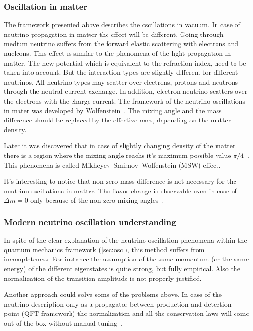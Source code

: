 \documentclass[../main.tex]{subfiles}
\begin{document}
\subsubsection{Oscillation in matter}
The framework presented above describes the oscillations in vacuum. In case of neutrino propagation in matter the effect will be different. Going through medium neutrino suffers from the forward elastic scattering with electrons and nucleons. This effect is similar to the phenomena of the light propagation in matter. The new potential which is equivalent to the refraction index, need to be taken into account. But the interaction types are slightly different for different neutrinos. All neutrino types may scatter over electrons, protons and neutrons through the neutral current exchange. In addition, electron neutrino scatters over the electrons with the charge current. The framework of the neutrino oscillations in mater was developed by Wolfenstein~\cite{Wolfenstein1978}. The mixing angle and the mass difference should be replaced by the effective ones, depending on the matter density.

Later it was discovered that in case of slightly changing density of the matter there is a region where the mixing angle reachs it's maximum possible value $\pi/4$~\cite{Mikheyev1985}. This phenomena is called Mikheyev–Smirnov–Wolfenstein (MSW) effect.

It's interesting to notice that non-zero mass difference is not necessary for the neutrino oscillations in matter. The flavor change is observable even in case of $\Delta m=0$ only because of the non-zero mixing angles~\cite{Smirnov2016}.


\subsubsection{Modern neutrino oscillation understanding}
In spite of the clear explanation of the neutrino oscillation phenomena within the quantum mechanics framework (\autoref{sec:osc}), this method suffers from incompleteness. For instance the assumption of the same momentum (or the same energy) of the different eigenstates is quite strong, but fully empirical. Also the normalization of the transition amplitude is not properly justified.

Another approach could solve some of the problems above. In case of the neutrino description only as a propagator between production and detection point (QFT framework) the normalization and all the conservation laws will come out of the box without manual tuning~\cite{Akhmedov2010a}.
\end{document}
